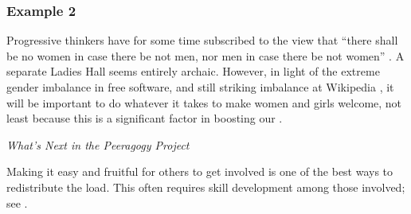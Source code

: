 \subsubsection*{Example 2}
Progressive thinkers have for
some time subscribed to the view that ``there shall be no women in
case there be not men, nor men in case there be not women''
\cite[Chapter 1.LII]{rabelais1894gargantua}.
A separate Ladies Hall seems entirely archaic.
However, in light of the
extreme gender imbalance in free software, and still striking
imbalance at Wikipedia \cite{gender,FM4291}, it will be important to
do whatever it takes to make women and girls welcome, not least
because this is a significant factor in boosting our
.


\begin{framed}
\noindent 
\emph{What's Next in the Peeragogy Project}
\begin{collectinmacro}{\CarryingWN}{}{}
Making it easy and fruitful for others to get involved is one of the best ways to redistribute the load.  This often requires skill development among those involved; see .
\end{collectinmacro}
\CarryingWN
\end{framed}



  
